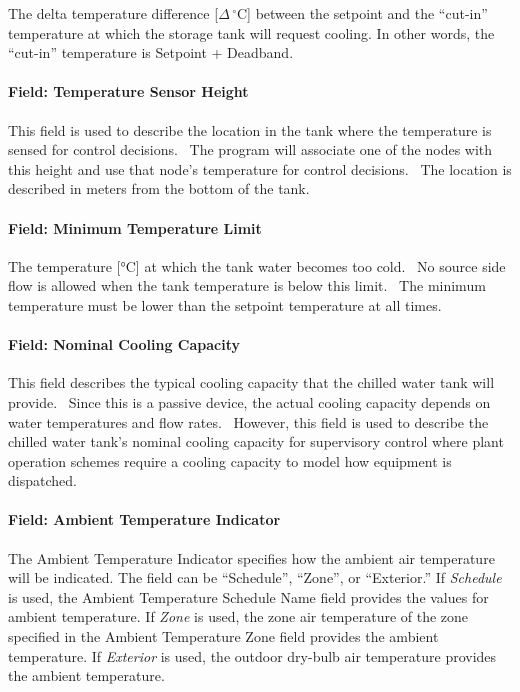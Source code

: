 The delta temperature difference {[}\(\Delta\,^{\circ}\mathrm{C}\){]} between the setpoint and the ``cut-in'' temperature at which the storage tank will request cooling. In other words, the ``cut-in'' temperature is Setpoint + Deadband.

\paragraph{Field: Temperature Sensor Height}\label{field-temperature-sensor-height}

This field is used to describe the location in the tank where the temperature is sensed for control decisions.~ The program will associate one of the nodes with this height and use that node's temperature for control decisions.~ The location is described in meters from the bottom of the tank.

\paragraph{Field: Minimum Temperature Limit}\label{field-minimum-temperature-limit-1}

The temperature {[}°C{]} at which the tank water becomes too cold.~ No source side flow is allowed when the tank temperature is below this limit.~ The minimum temperature must be lower than the setpoint temperature at all times.

\paragraph{Field: Nominal Cooling Capacity}\label{field-nominal-cooling-capacity-3}

This field describes the typical cooling capacity that the chilled water tank will provide.~ Since this is a passive device, the actual cooling capacity depends on water temperatures and flow rates.~ However, this field is used to describe the chilled water tank's nominal cooling capacity for supervisory control where plant operation schemes require a cooling capacity to model how equipment is dispatched.

\paragraph{Field: Ambient Temperature Indicator}\label{field-ambient-temperature-indicator-1}

The Ambient Temperature Indicator specifies how the ambient air temperature will be indicated. The field can be ``Schedule'', ``Zone'', or ``Exterior.'' If \emph{Schedule} is used, the Ambient Temperature Schedule Name field provides the values for ambient temperature. If \emph{Zone} is used, the zone air temperature of the zone specified in the Ambient Temperature Zone field provides the ambient temperature. If \emph{Exterior} is used, the outdoor dry-bulb air temperature provides the ambient temperature.

